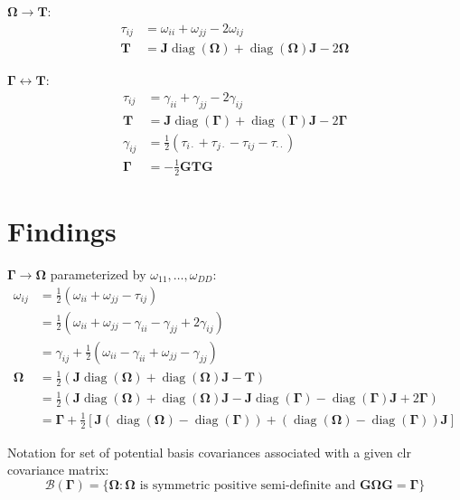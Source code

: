 \documentclass[12pt, letterpaper]{article}
\DeclareMathOperator{\diag}{\text{diag}}
\begin{document}
$\bm{\Omega} \rightarrow \bm{T}$:
\begin{align}
\tau_{ij} &= \omega_{ii} + \omega_{jj} - 2\omega_{ij} \\
\bm{T} &= \bm{J}\diag(\bm{\Omega}) + \diag(\bm{\Omega})\bm{J} - 2\bm{\Omega}
\end{align}

$\bm{\Gamma} \leftrightarrow \bm{T}$:
\begin{align}
\tau_{ij} &= \gamma_{ii} + \gamma_{jj} - 2\gamma_{ij} \\
\bm{T} &= \bm{J}\diag(\bm{\Gamma}) + \diag(\bm{\Gamma})\bm{J} - 2\bm{\Gamma} \\
\gamma_{ij} &= \frac{1}{2}(\tau_{i\cdot} + \tau_{j\cdot} - \tau_{ij} - \tau_{\cdot\cdot}) \\
\bm{\Gamma} &= -\frac{1}{2}\bm{G}\bm{T}\bm{G}
\end{align}

\section{Findings}

$\bm{\Gamma} \rightarrow \bm{\Omega}$ parameterized by $\omega_{11}, \dots, \omega_{DD}$:
\begin{align}
\omega_{ij} &= \frac{1}{2} \left( \omega_{ii} + \omega_{jj} - \tau_{ij} \right) \\
&= \frac{1}{2} \left( \omega_{ii} + \omega_{jj} - \gamma_{ii} - \gamma_{jj} + 2\gamma_{ij} \right) \\
&= \gamma_{ij} + \frac{1}{2} \left( \omega_{ii} - \gamma_{ii} + \omega_{jj} - \gamma_{jj} \right) \\
\bm{\Omega} &= \frac{1}{2} \left( \bm{J}\diag(\bm{\Omega}) + \diag(\bm{\Omega})\bm{J} - \bm{T} \right) \\
&= \frac{1}{2} \left( \bm{J}\diag(\bm{\Omega}) + \diag(\bm{\Omega})\bm{J} - \bm{J}\diag(\bm{\Gamma}) - \diag(\bm{\Gamma})\bm{J} + 2\bm{\Gamma} \right) \\
&= \bm{\Gamma} + \frac{1}{2} \left[ \bm{J} \left( \diag(\bm{\Omega}) - \diag(\bm{\Gamma}) \right) + \left(\diag(\bm{\Omega}) - \diag(\bm{\Gamma}) \right)\bm{J} \right]
\end{align}

Notation for set of potential basis covariances associated with a given clr covariance matrix:
\begin{equation}
\mathscr{B}(\bm{\Gamma}) = \{ \bm{\Omega}: \bm{\Omega} \text{ is symmetric positive semi-definite and } \bm{G}\bm{\Omega}\bm{G} = \bm{\Gamma} \}
\end{equation}
\end{document}
